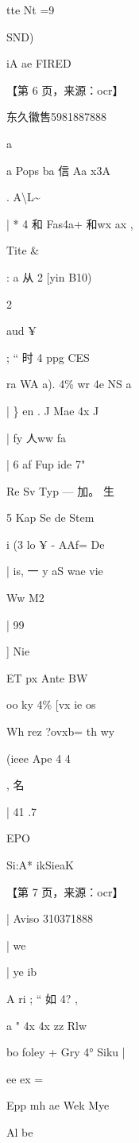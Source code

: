 \documentclass[UTF8,12pt,a4paper,openany]{ctexbook}
\begin{document}
\begin{enumerate}[label=\textbf{\arabic*.},leftmargin=2em]
tte                            Nt =9\par SND)\par iA ae FIRED\par \par 【第 6 页，来源：ocr】\par 东久徽售5981887888\par a\par a              Pops ba 信 Aa x3A\par .         A\textbackslash{}L\textasciitilde{}\par | *             4  和  Fas4a+ 和wx ax       ,\par Tite \&\par :     a  从 2 [yin B10)\par 2\par aud ¥\par ;       “      时       4 ppg CES\par ra          WA a).    4\% wr 4e NS a\par |        \} en .    J Mae 4x  J\par |             fy                    人ww     fa\par |                        6 af     Fup ide 7"\par Re                Sv   Typ             — 加。 生\par 5         Kap Se de Stem\par i        (3               lo ¥  -    AAf=  De\par |     is, 一 y aS      wae  vie\par Ww    M2\par |        99\par ]                                Nie\par ET      px Ante BW\par oo       ky    4\% [vx ie os\par Wh rez ?ovxb= th wy\par (ieee                Ape 4 4\par ,        名\par |                                                                                               41 .7\par EPO\par Si:A* ikSieaK\par \par 【第 7 页，来源：ocr】\par |     Aviso 310371888\par |                      we\par |      ye ib\par A  ri           ;   “     如    4?                                 ,\par a            "     4x 4x zz Rlw\par bo         foley  + Gry 4° Siku              |\par ee ex     =\par Epp     mh ae Wek         Mye\par Al be    
\end{enumerate}
\end{document}
